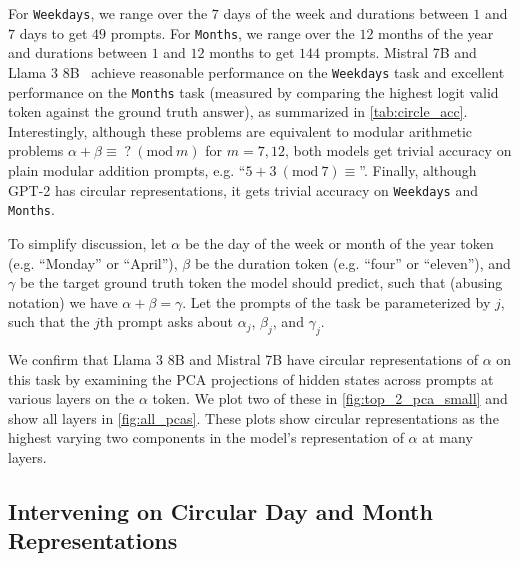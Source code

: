 \documentclass{article} %
\DeclareRobustCommand{\revOne}[1]{#1}
\theoremstyle{plain}
\theoremstyle{definition}
\newcommand{\Mod}[1]{\ (\mathrm{mod}\ #1)}
\newcommand{\josh}[1]{{\color{orange}{\bf Josh:} #1}}
\begin{document}
For \texttt{Weekdays}, we range over the $7$ days of the week and durations between $1$ and $7$ days to get $49$ prompts. For \texttt{Months}, we range over the $12$ months of the year and durations between $1$ and $12$ months to get $144$ prompts. Mistral 7B and Llama 3 8B~\citep{llama3modelcard} achieve reasonable performance on the \texttt{Weekdays} task and excellent performance on the \texttt{Months} task (measured by comparing the highest logit valid token against the ground truth answer), as summarized in \cref{tab:circle_acc}. Interestingly, although these problems are equivalent to modular arithmetic problems $\alpha + \beta \equiv \; ? \Mod m$ for $m = 7, 12$, both models get trivial accuracy on plain modular addition prompts, 
e.g. ``$5 + 3 \Mod{7} \equiv $''. Finally, although GPT-2 has circular representations, it gets trivial accuracy on \texttt{Weekdays} and \texttt{Months}.

To simplify discussion, let $\alpha$ be the day of the week or month of the year token (e.g. ``Monday'' or ``April''), $\beta$ be the duration token (e.g. ``four'' or ``eleven''), and $\gamma$ be the target ground truth token the model should predict, such that (abusing notation) we have $\alpha + \beta = \gamma$. Let the prompts of the task be parameterized by $j$, such that the $j$th prompt asks about $\alpha_j$, $\beta_j$, and $\gamma_j$.

\revOne{We confirm that Llama 3 8B and Mistral 7B have circular representations of $\alpha$ on this task by examining the PCA projections of hidden states across prompts at various layers on the $\alpha$ token. We plot two of these in \cref{fig:top_2_pca_small} and show all layers in \cref{fig:all_pcas}. These plots show circular representations as the highest varying two components in the model’s representation of $\alpha$ at many layers.}

\subsection{Intervening on Circular Day and Month Representations}
\label{sec:interventions}



\end{document}
